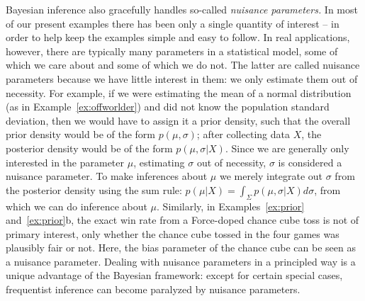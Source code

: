 Bayesian inference also gracefully handles so-called \textit{nuisance parameters.} In most of our present examples there has been only a single quantity of interest -- in order to help keep the examples simple and easy to follow. In real applications, however, there are typically many parameters in a statistical model, some of which we care about and some of which we do not. The latter are called nuisance parameters because we have little interest in them: we only estimate them out of necessity. For example, if we were estimating the mean of a normal distribution (as in Example~\ref{ex:offworlder}) and did not know the population standard deviation, then we would have to assign it a prior density, such that the overall prior density would be of the form $p(\mu,\sigma)$; after collecting data $X$, the posterior density would be of the form $p(\mu,\sigma|X)$. Since we are generally only interested in the parameter $\mu$, estimating $\sigma$ out of necessity, $\sigma$ is considered a nuisance parameter. To make inferences about $\mu$ we merely integrate out $\sigma$ from the posterior density using the sum rule: $p(\mu|X)= \int_{\Sigma}p(\mu,\sigma|X)d\sigma$, from which we can do inference about $\mu$. Similarly, in Examples~\ref{ex:prior} and~\ref{ex:prior}b, the exact win rate from a Force-doped chance cube toss is not of primary interest, only whether the chance cube tossed in the four games was plausibly fair or not. Here, the bias parameter of the chance cube can be seen as a nuisance parameter. Dealing with nuisance parameters in a principled way is a unique advantage of the Bayesian framework: except for certain special cases, frequentist inference can become paralyzed by nuisance parameters.

